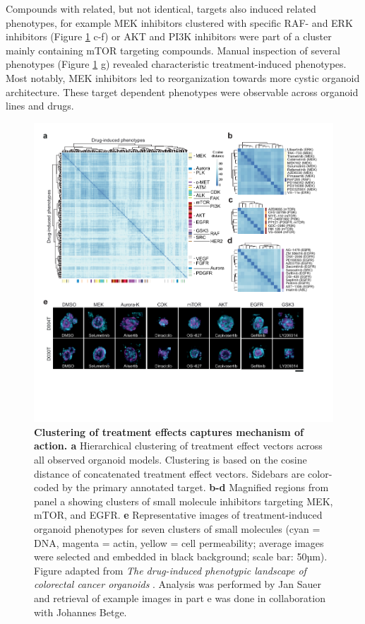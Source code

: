 \begin{flushleft}
Compounds with related, but not identical, targets also induced related phenotypes, for example MEK inhibitors clustered with specific RAF- and ERK inhibitors (Figure \ref{fig_231} c-f) or AKT and PI3K inhibitors were part of a cluster mainly containing mTOR targeting compounds. Manual inspection of several phenotypes (Figure \ref{fig_231} g) revealed characteristic treatment-induced phenotypes. Most notably, MEK inhibitors led to reorganization towards more cystic organoid architecture. These target dependent phenotypes were observable across organoid lines and drugs.

\begin{figure}[H]
\centering
\includegraphics[width=\textwidth,
                height=\textheight,
                keepaspectratio]{figures/promise/pdf/fig_3_1_1.pdf}
\caption[Clustering of treatment effects captures mechanism of action]{\textbf{Clustering of treatment effects captures mechanism of action. a} Hierarchical clustering of treatment effect vectors across all observed organoid models. Clustering is based on the cosine distance of concatenated treatment effect vectors. Sidebars are color-coded by the primary annotated target. \textbf{b-d} Magnified regions from panel a showing clusters of small molecule inhibitors targeting MEK, mTOR, and EGFR. \textbf{e} Representative images of treatment-induced organoid phenotypes for seven clusters of small molecules (cyan = DNA, magenta = actin, yellow = cell permeability; average images were selected and embedded in black background; scale bar: 50µm). Figure adapted from \textit{The drug-induced phenotypic landscape of colorectal cancer organoids} \parencite{betgeDruginducedPhenotypicLandscape2022}. Analysis was performed by Jan Sauer and retrieval of example images in part e was done in collaboration with Johannes Betge.}
\label{fig_231}
\end{figure}
\bigbreak


\end{flushleft}
